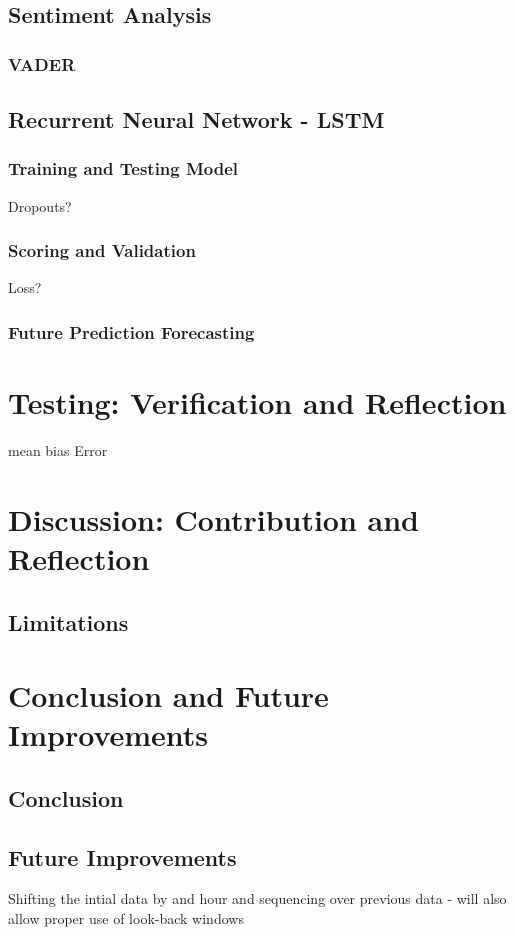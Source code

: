 \documentclass[oneside, 10pt]{article}
\begin{document}
		\subsection{Sentiment Analysis}
			\subsubsection{VADER}
			
		\subsection{Recurrent Neural Network - LSTM}
			\subsubsection{Training and Testing Model}
			Dropouts?
			\subsubsection{Scoring and Validation}
			Loss?
			\subsubsection{Future Prediction Forecasting}
			
	\newpage
	
	\section{Testing: Verification and Reflection}
	mean bias Error
	
	\newpage
	
	\section{Discussion: Contribution and Reflection}
	\subsection{Limitations}
	
	
	\newpage
	
	\section{Conclusion and Future Improvements}
		\subsection{Conclusion}
		\subsection{Future Improvements}
		Shifting the intial data by and hour and sequencing over previous data - will also allow proper use of look-back windows
		
\end{document}
